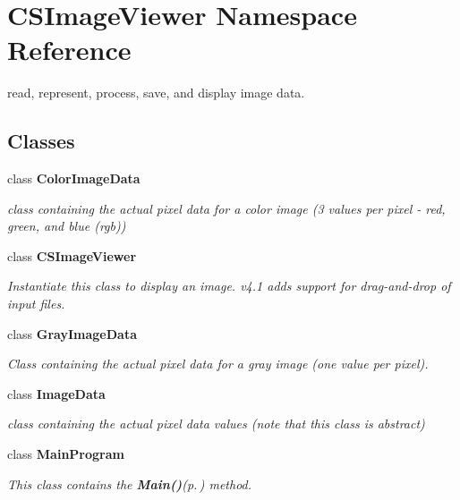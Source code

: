\section{CSImage\-Viewer Namespace Reference}
\label{namespace_c_s_image_viewer}
read, represent, process, save, and display image data.  


\subsection*{Classes}
\begin{CompactItemize}
\item 
class {\bf Color\-Image\-Data}
\begin{CompactList}\small\item\em class containing the actual pixel data for a color image (3 values per pixel - red, green, and blue (rgb)) \item\end{CompactList}\item 
class {\bf CSImage\-Viewer}
\begin{CompactList}\small\item\em Instantiate this class to display an image. v4.1 adds support for drag-and-drop of input files. \item\end{CompactList}\item 
class {\bf Gray\-Image\-Data}
\begin{CompactList}\small\item\em Class containing the actual pixel data for a gray image (one value per pixel). \item\end{CompactList}\item 
class {\bf Image\-Data}
\begin{CompactList}\small\item\em class containing the actual pixel data values (note that this class is abstract) \item\end{CompactList}\item 
class {\bf Main\-Program}
\begin{CompactList}\small\item\em This class contains the {\bf Main()}{\rm (p.\,\pageref{class_c_s_image_viewer_1_1_main_program_1f7e61855217a4f3ad075ae5cb5a7cff})} method. \item\end{CompactList}\item 

\end{CompactItemize}
